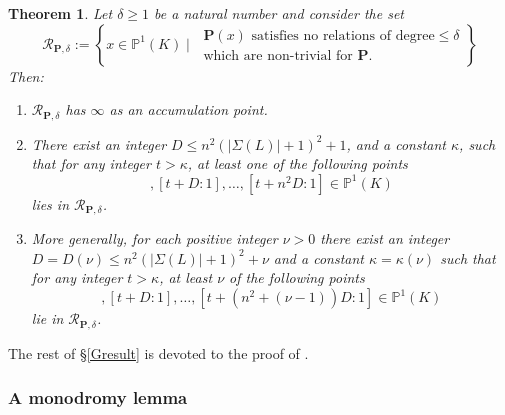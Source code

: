\documentclass[10pt]{article}
\numberwithin{equation}{section}
\theoremstyle{plain}
\newtheorem{thm}{Theorem}[section]
\theoremstyle{definition}
\theoremstyle{remark}
\newcommand{\PP}{\mathbb{P}}
\begin{document}
\begin{thm}\label{thmwithproof}
Let $\delta \ge 1$ be a natural number and consider the set
\begin{equation}
\mathcal{R}_{\mathbf{P},\delta} := \left\{ x \in \mathbb{P}^1(K) \mid\; \begin{array}{c} \mathbf{P}(x) \text{ satisfies no relations of degree}\leq \delta \\ \text{which are non-trivial for $\mathbf{P}$.} \end{array} \right\}
\end{equation}
Then:
\begin{enumerate}
    \item[(1)] $\mathcal{R}_{\mathbf{P},\delta}$ has $\infty$ as an accumulation point. 
    \item[(2)] There exist an integer $D \leq n^2 (|\Sigma(L)|+1)^2 + 1$, and a constant $\kappa$, such that for any integer $t > \kappa$, at least one of the following points
    \begin{displaymath}
        [t:1], [t+D:1],\dots, [t+n^2D:1] \in \PP^1(K)
    \end{displaymath}
     lies in $\mathcal{R}_{\mathbf{P},\delta}$.
\item[(3)] More generally, for each positive integer $\nu > 0$ there exist an integer $D = D(\nu) \leq n^2 (|\Sigma(L)|+1)^2 + \nu$ and a constant $\kappa = \kappa(\nu)$ such that for any integer $t > \kappa$, at least $\nu$ of the following points 
    \begin{displaymath}
        [t:1], [t+D:1],\dots, [t+(n^2 + (\nu-1))D:1] \in \PP^1(K)
    \end{displaymath}
     lie in $\mathcal{R}_{\mathbf{P},\delta}$.
\end{enumerate}
\end{thm}
The rest of \S\ref{Gresult} is devoted to the proof of .

\subsubsection{A monodromy lemma}
\end{document}
